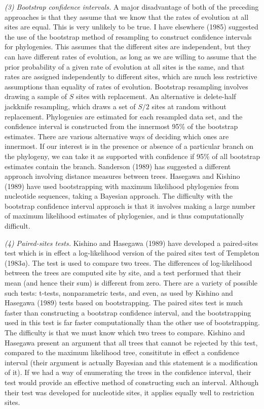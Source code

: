 {\it (3) Bootstrap confidence intervals.}    A major disadvantage of both of
the preceding approaches is that they assume that we know that the rates
of evolution at all sites are equal.  This is very unlikely to be true.  I have
elsewhere (1985) suggested the use of the bootstrap method of resampling
to construct confidence intervals for phylogenies.  This assumes that the
different sites are independent, but they can have different rates of
evolution, as long as we are willing to assume that the prior probability
of a given rate of evolution at all sites is the same, and that rates are
assigned independently to different sites,  which are much less
restrictive assumptions than equality of rates of evolution.  Bootstrap
resampling involves drawing a sample of $S$ sites with replacement. An
alternative is delete-half jackknife resampling, which draws a set of $S/2$
sites at random without replacement.  Phylogenies are estimated for each
resampled data set, and the confidence interval is constructed from the
innermost 95\% of the bootstrap estimates.  There are various alternative
ways of deciding which ones are innermost.  If our interest is in the
presence or absence of a particular branch on the phylogeny, we can take
it as supported with confidence if 95\% of all bootstrap estimates contain
the branch.  Sanderson (1989) has suggested a different approach involving
distance measures between trees.  Hasegawa and Kishino (1989) have used
bootstrapping with maximum likelihood phylogenies from nucleotide sequences,
taking a Bayesian approach.  The difficulty with the bootstrap confidence
interval approach is that it involves making a large number of
maximum likelihood estimates of phylogenies, and is thus computationally
difficult.

{\it (4) Paired-sites tests.}  Kishino and Hasegawa (1989) have developed
a paired-sites test which is in effect a log-likelihood version of the paired
sites test of Templeton (1983{\it a}).  The test is used to compare two trees.
The differences of log-likelihood between the trees are computed site by site,
and a test performed that their mean (and hence their sum) is different from
zero.  There are a variety of possible such tests: t-tests, nonparametric
tests, and even, as used by Kishino and Hasegawa (1989) tests based on
bootstrapping.  The paired sites test is much faster than constructing a
bootstrap confidence interval, and the bootstrapping used in this test is
far faster computationally than the other use of bootstrapping.  The difficulty
is that we must know which two trees to compare.  Kishino and Hasegawa present
an argument that all trees that cannot be rejected by this test, compared to
the maximum likelihood tree, consititute in effect a confidence interval (their
argument is actually Bayesian and this statement is a modification of it).   If
we had a way
of enumerating the trees in the confidence interval, their test would provide
an effective method of constructing such an interval.  Although their test
was developed for nucleotide sites, it applies equally well to restriction
sites.

